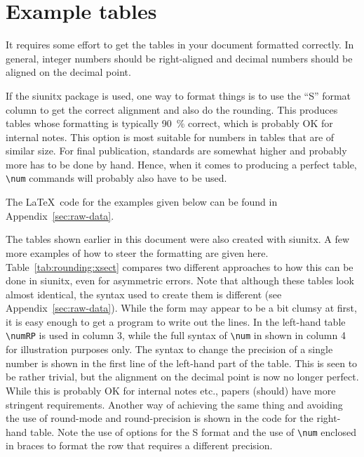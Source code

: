 \documentclass[UKenglish]{latex/atlasdoc}
\newcommand*\Macro[1]{\texttt{\textbackslash#1}}
\begin{document}
\section{Example tables}
\label{sec:table}

It requires some effort to get the tables in your document formatted
correctly. In general, integer numbers should be right-aligned and
decimal numbers should be aligned on the decimal point.

If the \textsf{siunitx} package is used, one way to format things is
to use the \enquote{S} format column to get the correct alignment and
also do the rounding. This produces tables whose formatting is
typically \SI{90}{\percent} correct, which is probably OK for internal
notes. This option is most suitable for numbers in tables that are of
similar size. For final publication, standards are somewhat higher and probably
more has to be done by hand. Hence, when it comes to producing a perfect
table, \Macro{num} commands will probably also have to be used.

The \LaTeX\ code for the examples given below can be found in 
Appendix~\ref{sec:raw-data}.

The tables shown earlier in this document were also created with \textsf{siunitx}.
 A few more examples of how to steer the formatting are given here.
Table~\ref{tab:rounding:xsect} compares two different approaches
to how this can be done  in \textsf{siunitx}, even for asymmetric errors.  Note that although these
tables look almost identical, the syntax used to create them is different (see Appendix~\ref{sec:raw-data}).
While the form may appear to be a bit clumsy at first, it is easy enough to get a
program to write out the lines. In the left-hand table
\Macro{numRP} is used in column 3, while the full syntax of \Macro{num} 
in shown in column 4 for illustration purposes only.  The syntax
to change the precision of a single number is shown in the first line of
the left-hand part of the table. This is seen to be rather
trivial, but the alignment on the decimal point is now no longer
perfect. While this is probably OK for internal notes etc., papers
(should) have more stringent requirements. Another way of achieving
the same thing and avoiding the use of \textsf{round-mode} and
\textsf{round-precision} is shown in the code for the right-hand table. Note the
use of options for the \textsf{S} format and the use of \Macro{num} enclosed
in braces to format the row that requires a different precision.
\end{document}
